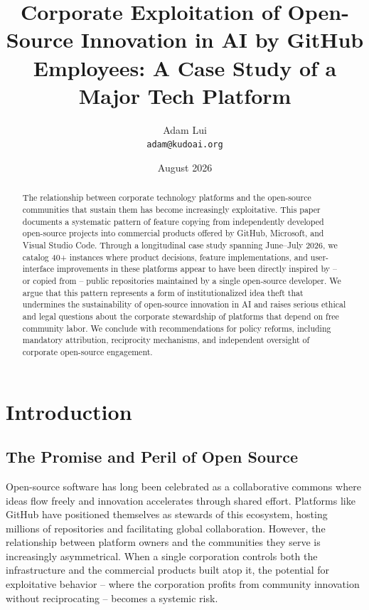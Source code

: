 \documentclass[12pt]{article}
\title{Corporate Exploitation of Open-Source Innovation in AI by GitHub Employees: A Case Study of a Major Tech Platform}
\author{Adam Lui \\ \texttt{adam@kudoai.org}}
\date{August 2026}
\begin{document}
\maketitle

\begin{abstract}
The relationship between corporate technology platforms and the open-source communities that sustain them has become increasingly exploitative. This paper documents a systematic pattern of feature copying from independently developed open-source projects into commercial products offered by GitHub, Microsoft, and Visual Studio Code. Through a longitudinal case study spanning June--July 2026, we catalog 40+ instances where product decisions, feature implementations, and user-interface improvements in these platforms appear to have been directly inspired by -- or copied from -- public repositories maintained by a single open-source developer. We argue that this pattern represents a form of institutionalized idea theft that undermines the sustainability of open-source innovation in AI and raises serious ethical and legal questions about the corporate stewardship of platforms that depend on free community labor. We conclude with recommendations for policy reforms, including mandatory attribution, reciprocity mechanisms, and independent oversight of corporate open-source engagement.
\end{abstract}

\section{Introduction}

\subsection{The Promise and Peril of Open Source}
Open-source software has long been celebrated as a collaborative commons where ideas flow freely and innovation accelerates through shared effort. Platforms like GitHub have positioned themselves as stewards of this ecosystem, hosting millions of repositories and facilitating global collaboration. However, the relationship between platform owners and the communities they serve is increasingly asymmetrical. When a single corporation controls both the infrastructure and the commercial products built atop it, the potential for exploitative behavior -- where the corporation profits from community innovation without reciprocating -- becomes a systemic risk.
\end{document}
